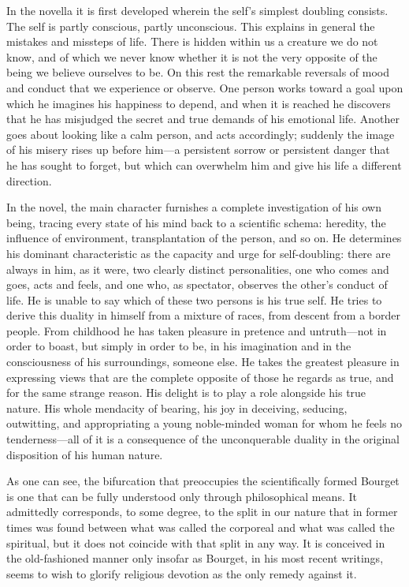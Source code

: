 \documentclass[12pt,a4paper]{article}
\begin{document}
In the novella it is first developed wherein the self's simplest
doubling consists. The self is partly conscious, partly unconscious.
This explains in general the mistakes and missteps of life. There is
hidden within us a creature we do not know, and of which we never know
whether it is not the very opposite of the being we believe ourselves
to be. On this rest the remarkable reversals of mood and conduct that
we experience or observe. One person works toward a goal upon which
he imagines his happiness to depend, and when it is reached he
discovers that he has misjudged the secret and true demands of his
emotional life. Another goes about looking like a calm person, and
acts accordingly; suddenly the image of his misery rises up before
him---a persistent sorrow or persistent danger that he has sought to
forget, but which can overwhelm him and give his life a different
direction.

In the novel, the main character furnishes a complete investigation of
his own being, tracing every state of his mind back to a scientific
schema: heredity, the influence of environment, transplantation of
the person, and so on. He determines his dominant characteristic as
the capacity and urge for self-doubling: there are always in him, as
it were, two clearly distinct personalities, one who comes and goes,
acts and feels, and one who, as spectator, observes the other's
conduct of life. He is unable to say which of these two persons is
his true self. He tries to derive this duality in himself from a
mixture of races, from descent from a border people. From childhood he
has taken pleasure in pretence and untruth---not in order to boast,
but simply in order to be, in his imagination and in the consciousness
of his surroundings, someone else. He takes the greatest pleasure in
expressing views that are the complete opposite of those he regards
as true, and for the same strange reason. His delight is to play a
role alongside his true nature. His whole mendacity of bearing, his
joy in deceiving, seducing, outwitting, and appropriating a young
noble-minded woman for whom he feels no tenderness---all of it is a
consequence of the unconquerable duality in the original disposition
of his human nature.

As one can see, the bifurcation that preoccupies the scientifically
formed Bourget is one that can be fully understood only through
philosophical means. It admittedly corresponds, to some degree, to the
split in our nature that in former times was found between what was
called the corporeal and what was called the spiritual, but it does
not coincide with that split in any way. It is conceived in the
old-fashioned manner only insofar as Bourget, in his most recent
writings, seems to wish to glorify religious devotion as the only
remedy against it.
\end{document}
